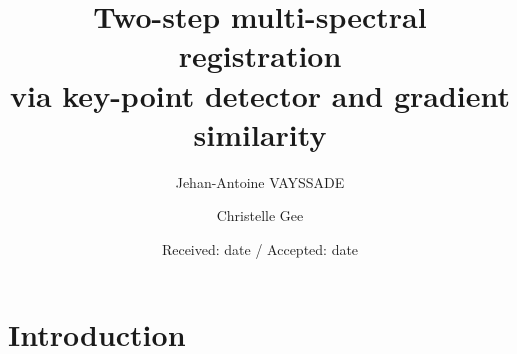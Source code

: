 \documentclass[]{elsarticle}
\begin{document}
	\begin{frontmatter}
		\title{Two-step multi-spectral registration \\ via key-point detector and gradient similarity}
		\author[unilu]{Jehan-Antoine VAYSSADE} 
		\author[unilu]{Christelle Gee} 
		\address[myuni]{Agroécologie, AgroSup Dijon, INRA, Univ. Bourgogne, Univ. Bourgogne Franche-Comté, F-21000 Dijon, France}
		\date{Received: date / Accepted: date}
	\end{frontmatter}
	
	\newpage
	
	\section{Introduction}
	
\end{document}
